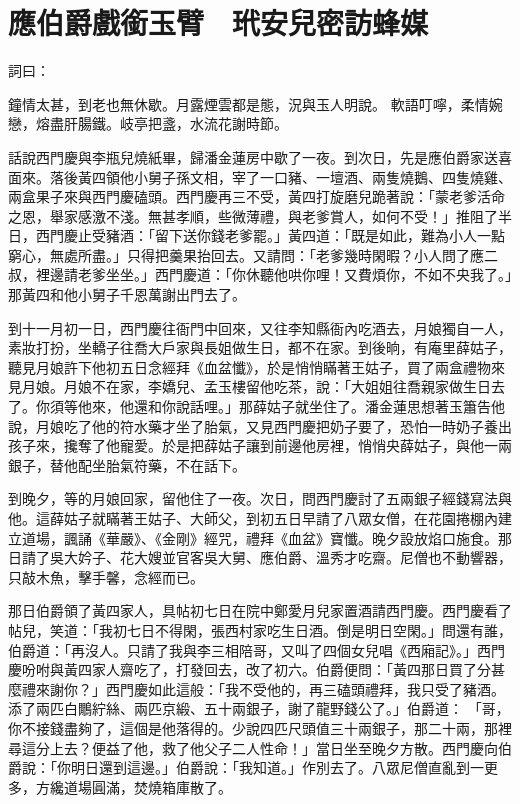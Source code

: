 %

\chapter{應伯爵戲銜玉臂　玳安兒密訪蜂媒}

詞曰：

鐘情太甚，到老也無休歇。月露煙雲都是態，況與玉人明說。
軟語叮嚀，柔情婉戀，熔盡肝腸鐵。岐亭把盞，水流花謝時節。

話說西門慶與李瓶兒燒紙畢，歸潘金蓮房中歇了一夜。到次日，先是應伯爵家送喜面來。落後黃四領他小舅子孫文相，宰了一口豬、一壇酒、兩隻燒鵝、四隻燒雞、兩盒果子來與西門慶磕頭。西門慶再三不受，黃四打旋磨兒跪著說：「蒙老爹活命之恩，舉家感激不淺。無甚孝順，些微薄禮，與老爹賞人，如何不受！」推阻了半日，西門慶止受豬酒：「留下送你錢老爹罷。」黃四道：「既是如此，難為小人一點窮心，無處所盡。」只得把羹果抬回去。又請問：「老爹幾時閑暇？小人問了應二叔，裡邊請老爹坐坐。」西門慶道：「你休聽他哄你哩！又費煩你，不如不央我了。」那黃四和他小舅子千恩萬謝出門去了。

到十一月初一日，西門慶往衙門中回來，又往李知縣衙內吃酒去，月娘獨自一人，素妝打扮，坐轎子往喬大戶家與長姐做生日，都不在家。到後晌，有庵里薛姑子，聽見月娘許下他初五日念經拜《血盆懺》，於是悄悄瞞著王姑子，買了兩盒禮物來見月娘。月娘不在家，李嬌兒、孟玉樓留他吃茶，說：「大姐姐往喬親家做生日去了。你須等他來，他還和你說話哩。」那薛姑子就坐住了。潘金蓮思想著玉簫告他說，月娘吃了他的符水藥才坐了胎氣，又見西門慶把奶子要了，恐怕一時奶子養出孩子來，攙奪了他寵愛。於是把薛姑子讓到前邊他房裡，悄悄央薛姑子，與他一兩銀子，替他配坐胎氣符藥，不在話下。

到晚夕，等的月娘回家，留他住了一夜。次日，問西門慶討了五兩銀子經錢寫法與他。這薛姑子就瞞著王姑子、大師父，到初五日早請了八眾女僧，在花園捲棚內建立道場，諷誦《華嚴》、《金剛》經咒，禮拜《血盆》寶懺。晚夕設放焰口施食。那日請了吳大妗子、花大嫂並官客吳大舅、應伯爵、溫秀才吃齋。尼僧也不動響器，只敲木魚，擊手馨，念經而已。

那日伯爵領了黃四家人，具帖初七日在院中鄭愛月兒家置酒請西門慶。西門慶看了帖兒，笑道：「我初七日不得閑，張西村家吃生日酒。倒是明日空閑。」問還有誰，伯爵道：「再沒人。只請了我與李三相陪哥，又叫了四個女兒唱《西廂記》。」西門慶吩咐與黃四家人齋吃了，打發回去，改了初六。伯爵便問：「黃四那日買了分甚麼禮來謝你？」西門慶如此這般：「我不受他的，再三磕頭禮拜，我只受了豬酒。添了兩匹白鷳紵絲、兩匹京緞、五十兩銀子，謝了龍野錢公了。」伯爵道： 「哥，你不接錢盡夠了，這個是他落得的。少說四匹尺頭值三十兩銀子，那二十兩，那裡尋這分上去？便益了他，救了他父子二人性命！」當日坐至晚夕方散。西門慶向伯爵說：「你明日還到這邊。」伯爵說：「我知道。」作別去了。八眾尼僧直亂到一更多，方纔道場圓滿，焚燒箱庫散了。

